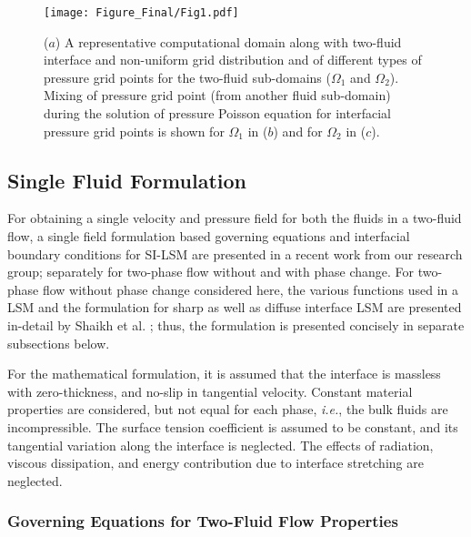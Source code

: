\documentclass[preprint,12pt]{elsarticle}
\newcommand{\review}[1]{\color{black}#1}
\begin{document}
\begin{figure}
\begin{centering}
\texttt{[image: Figure\_Final/Fig1.pdf]}
\par\end{centering}
\protect\caption{\label{fig:Computational-domain-with}($a$) A representative computational
domain along with two-fluid interface and non-uniform grid distribution
and  of different types of pressure grid points for the two-fluid
sub-domains ($\Omega_{1}$ and $\Omega_{2}$). Mixing of pressure
grid point (from another fluid sub-domain) during the solution of
pressure Poisson equation for interfacial pressure grid points is
shown  for $\Omega_{1}$ in ($b$) and for $\Omega_{2}$ in ($c$). }
\end{figure}

\subsection{\review{Single Fluid Formulation}}

For obtaining a single velocity and pressure field for both the fluids
in a two-fluid flow, a single field formulation based governing equations
and interfacial boundary conditions for SI-LSM are presented in a
recent work from our research group; separately for two-phase flow
without \cite{shaikh2018} and with \cite{shaikh2019} phase change. For
two-phase flow without phase change considered here, the various functions
used in a LSM and the formulation for sharp as well as diffuse interface
LSM are presented in-detail by Shaikh et al. \cite{shaikh2018}; thus,
the formulation is presented concisely in separate subsections below.

For the mathematical formulation, it is assumed that the interface
is massless with zero-thickness, and no-slip in tangential velocity.
Constant material properties are considered, but not equal for each
phase, \emph{i.e.}, the bulk fluids are incompressible. The surface
tension coefficient is assumed to be constant, and its tangential
variation along the interface is neglected. The effects of radiation,
viscous dissipation, and energy contribution due to interface stretching
are neglected.



\subsubsection{Governing Equations for Two-Fluid Flow Properties}\label{sec2.1.1}
\end{document}
